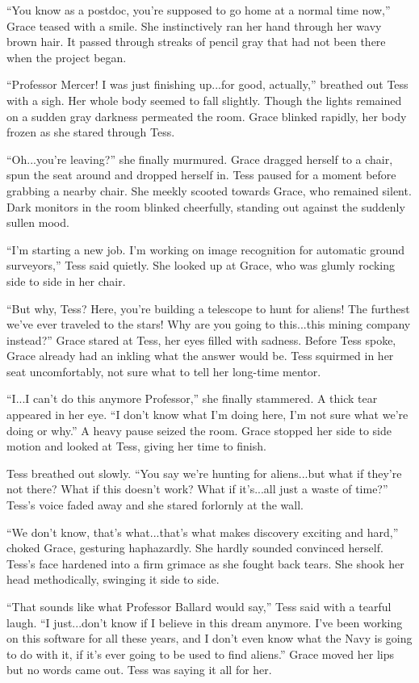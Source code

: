 \documentclass[12pt]{article} %
\begin{document}
``You know as a postdoc, you're supposed to go home at a normal time now,'' Grace teased with a smile. She instinctively ran her hand through her wavy brown hair. It passed through streaks of pencil gray that had not been there when the project began.

``Professor Mercer! I was just finishing up...for good, actually,'' breathed out Tess with a sigh. Her whole body seemed to fall slightly. Though the lights remained on a sudden gray darkness permeated the room. Grace blinked rapidly, her body frozen as she stared through Tess.

``Oh...you're leaving?'' she finally murmured. Grace dragged herself to a chair, spun the seat around and dropped herself in. Tess paused for a moment before grabbing a nearby chair. She meekly scooted towards Grace, who remained silent. Dark monitors in the room blinked cheerfully, standing out against the suddenly sullen mood.

``I'm starting a new job. I'm working on image recognition for automatic ground surveyors,'' Tess said quietly. She looked up at Grace, who was glumly rocking side to side in her chair.

``But why, Tess? Here, you're building a telescope to hunt for aliens! The furthest we've ever traveled to the stars! Why are you going to this...this mining company instead?'' Grace stared at Tess, her eyes filled with sadness. Before Tess spoke, Grace already had an inkling what the answer would be. Tess squirmed in her seat uncomfortably, not sure what to tell her long-time mentor.

``I...I can't do this anymore Professor,'' she finally stammered. A thick tear appeared in her eye. ``I don't know what I'm doing here, I'm not sure what we're doing or why.'' A heavy pause seized the room. Grace stopped her side to side motion and looked at Tess, giving her time to finish.

Tess breathed out slowly. ``You say we're hunting for aliens...but what if they're not there? What if this doesn't work? What if it's...all just a waste of time?'' Tess's voice faded away and she stared forlornly at the wall.

``We don't know, that's what...that's what makes discovery exciting and hard,'' choked Grace, gesturing haphazardly. She hardly sounded convinced herself. Tess's face hardened into a firm grimace as she fought back tears. She shook her head methodically, swinging it side to side.

``That sounds like what Professor Ballard would say,'' Tess said with a tearful laugh. ``I just...don't know if I believe in this dream anymore. I've been working on this software for all these years, and I don't even know what the Navy is going to do with it, if it's ever going to be used to find aliens.'' Grace moved her lips but no words came out. Tess was saying it all for her.
\end{document}
